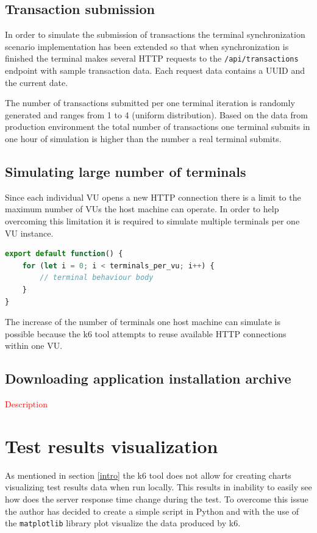 \documentclass[12pt, a4paper]{article}
\newcommand\todo[1]{\textcolor{red}{#1}}
\let\oldsection\section
\renewcommand\section{\clearpage\oldsection}
\begin{document}
\subsection{Transaction submission}
In order to simulate the submission of transactions the terminal synchronization scenario implementation has been extended so that when synchronization is finished the terminal makes several HTTP requests to the \texttt{/api/transactions} endpoint with sample transaction data.
Each request data contains a UUID and the current date.

The number of transactions submitted per one terminal iteration is randomly generated and ranges from 1 to 4 (uniform distribution).
Based on the data from production environment the total number of transactions one terminal submits in one hour of simulation is higher than the number a real terminal submits.

\subsection{Simulating large number of terminals}

Since each individual VU opens a new HTTP connection there is a limit to the maximum number of VUs the host machine can operate.
In order to help overcoming this limitation it is required to simulate multiple terminals per one VU instance.

\begin{lstlisting}[language=JavaScript, caption={Multiple terminals per one VU},captionpos=b]
export default function() {
    for (let i = 0; i < terminals_per_vu; i++) {
        // terminal behaviour body
    }
}
\end{lstlisting}

The increase of the number of terminals one host machine can simulate is possible because the k6 tool attempts to reuse available HTTP connections within one VU.

\subsection{Downloading application installation archive}
\todo{Description}

\section{Test results visualization}

As mentioned in section \ref{intro} the k6 tool does not allow for creating charts visualizing test results data when run locally.
This results in inability to easily see how does the server response time change during the test.
To overcome this issue the author has decided to create a simple script in Python and with the use of the \texttt{matplotlib} library plot visualize the data produced by k6.
\end{document}
